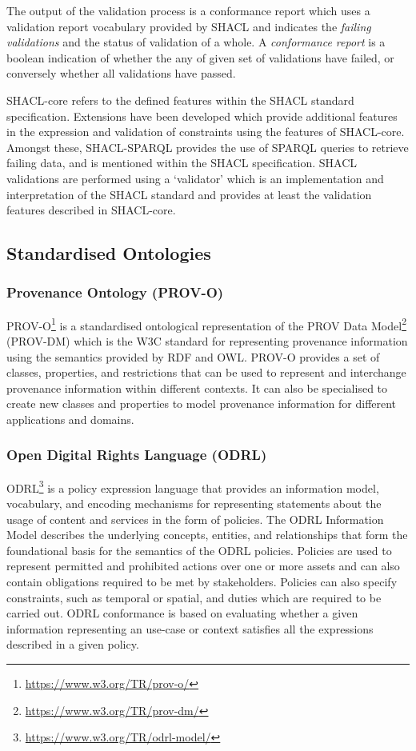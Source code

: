 The output of the validation process is a conformance report which uses a validation report vocabulary provided by SHACL and indicates the \textit{failing validations} and the status of validation of a whole. A \textit{conformance report} is a boolean indication of whether the any of given set of validations have failed, or conversely whether all validations have passed.

SHACL-core refers to the defined features within the SHACL standard specification. Extensions have been developed which provide additional features in the expression and validation of constraints using the features of SHACL-core. Amongst these, SHACL-SPARQL provides the use of SPARQL queries to retrieve failing data, and is mentioned within the SHACL specification.
SHACL validations are performed using a `validator' which is an implementation and interpretation of the SHACL standard and provides at least the validation features described in SHACL-core.

\subsection{Standardised Ontologies}
\subsubsection{Provenance Ontology (PROV-O)}
PROV-O\footnote{\url{https://www.w3.org/TR/prov-o/}} is a standardised ontological representation of the PROV Data Model\footnote{\url{https://www.w3.org/TR/prov-dm/}} (PROV-DM) which is the W3C standard for representing provenance information using the semantics provided by RDF and OWL.
PROV-O provides a set of classes, properties, and restrictions that can be used to represent and interchange provenance information within different contexts.
It can also be specialised to create new classes and properties to model provenance information for different applications and domains.

\subsubsection{Open Digital Rights Language (ODRL)}
ODRL\footnote{\url{https://www.w3.org/TR/odrl-model/}} is a policy expression language that provides an information model, vocabulary, and encoding mechanisms for representing statements about the usage of content and services in the form of policies. The ODRL Information Model describes the underlying concepts, entities, and relationships that form the foundational basis for the semantics of the ODRL policies.
Policies are used to represent permitted and prohibited actions over one or more assets and can also contain obligations required to be met by stakeholders.
Policies can also specify constraints, such as temporal or spatial, and duties which are required to be carried out.
ODRL conformance is based on evaluating whether a given information representing an use-case or context satisfies all the expressions described in a given policy.